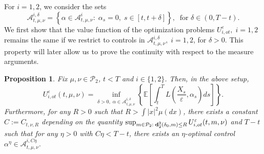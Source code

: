 \documentclass[reqno,11pt]{amsart}
\newtheorem{proposition}[theorem]{Proposition}
\numberwithin{equation}{section}
\newcommand{\be}{\begin{equation}}
\newcommand{\ee}{\end{equation}}
\newcommand{\e}{\varepsilon}
\newcommand{\nd}{\noindent}
\begin{document}
\nd
For $i=1,2$, we consider the sets
$$\mathcal{A}^{i,\delta}_{t,\mu,\nu}=\left\{ \alpha\in\mathcal{A}_{t,\mu,\nu}^i:\; \alpha_s=0,\; s\in [t,t+\delta]\right\},\;\; \text{for }\delta\in (0,T-t).$$
We first show that the value function of the optimization problems $U^\e_{i,ot},\;i=1,2$ remains the same if we restrict to controls in $\mathcal{A}_{t,\mu,\nu}^{i,\delta},\;i=1,2$, for $\delta>0$. This property will later allow us to prove the continuity with respect to the measure arguments.

\begin{proposition}\label{altformulaot}
    Fix $\mu,\nu\in \mathcal{P}_2$, $t<T$ and $i\in \{1,2\}$. Then, in the above setup,
    \be\label{approxot}
    U_{i,ot}^\e(t,\mu,\nu)=\inf_{\delta>0,\;\alpha\in \mathcal{A}^{i,\delta}_{t,\mu,\nu}}\left\{ \mathbb{E}\left[ \int_t^TL\left( \frac{X_s}{\e},\alpha_s\right)ds\right]\right\}.
    \ee
    Furthermore, for any $R>0$ such that $R>\int|x|^2\mu(dx)$, there exists a constant $C:=C_{t,\nu,R}$ depending on the quantity $\sup_{m\in \mathcal{P}_2:\; {\bf d}_2^2(\delta_0,m)\le R}U_{i,ot}^\e(t,m,\nu)$ and $T-t$ such that for any $\eta>0$ with $C\eta<T-t$, there exists an $\eta$-optimal control $\alpha^\eta\in \mathcal{A}^{i,C\eta}_{t,\mu,\nu}$.
\end{proposition}
\end{document}
